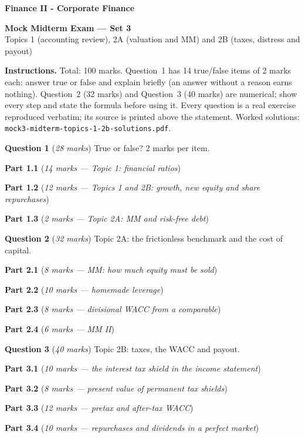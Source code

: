 \documentclass[11pt,a4paper]{article}
\newcommand{\qpart}[2]{\par\needspace{12\baselineskip}\medskip\noindent\textbf{#1} (\emph{#2})\par}
\begin{document}
\textbf{Finance II - Corporate Finance}

\begin{center}
  {\LARGE\bfseries Mock Midterm Exam --- Set 3}\\[4pt]
  {\large Topics 1 (accounting review), 2A (valuation and MM) and 2B (taxes, distress and payout)}
\end{center}

\noindent\textbf{Instructions.} Total: 100 marks. Question~1 has 14 true/false items of 2 marks each:
answer true or false and explain briefly (an answer without a reason earns nothing). Question~2 (32 marks)
and Question~3 (40 marks) are numerical; show every step and state the formula before using it. Every
question is a real exercise reproduced verbatim; its source is printed above the statement. Worked
solutions: \texttt{mock3-midterm-topics-1-2b-solutions.pdf}.

\bigskip
\noindent\textbf{Question 1} (\emph{28 marks}) True or false? 2 marks per item.

\qpart{Part 1.1}{14 marks --- Topic 1: financial ratios}
\QoneA

\qpart{Part 1.2}{12 marks --- Topics 1 and 2B: growth, new equity and share repurchases}
\QoneB

\qpart{Part 1.3}{2 marks --- Topic 2A: MM and risk-free debt}
\QoneC

\bigskip
\noindent\textbf{Question 2} (\emph{32 marks}) Topic 2A: the frictionless benchmark and the cost of
capital.

\QtwoIntro

\qpart{Part 2.1}{8 marks --- MM: how much equity must be sold}
\QtwoA

\qpart{Part 2.2}{10 marks --- homemade leverage}
\QtwoB

\qpart{Part 2.3}{8 marks --- divisional WACC from a comparable}
\QtwoC

\qpart{Part 2.4}{6 marks --- MM II}
\QtwoD

\bigskip
\noindent\textbf{Question 3} (\emph{40 marks}) Topic 2B: taxes, the WACC and payout.

\qpart{Part 3.1}{10 marks --- the interest tax shield in the income statement}
\QthreeA

\qpart{Part 3.2}{8 marks --- present value of permanent tax shields}
\QthreeB

\qpart{Part 3.3}{12 marks --- pretax and after-tax WACC}
\QthreeC

\qpart{Part 3.4}{10 marks --- repurchases and dividends in a perfect market}
\QthreeD
\end{document}
